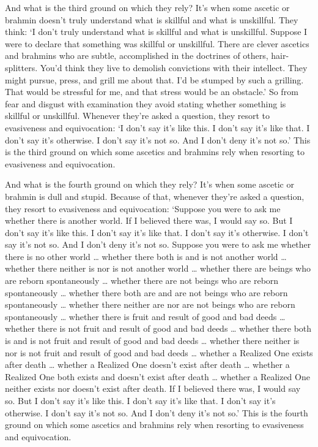 \documentclass[12pt,openany]{book}%
\begin{document}
And what is the third ground on which they rely? It’s when some ascetic or brahmin doesn’t truly understand what is skillful and what is unskillful. They think: ‘I don’t truly understand what is skillful and what is unskillful. Suppose I were to declare that something was skillful or unskillful. There are clever ascetics and brahmins who are subtle, accomplished in the doctrines of others, hair-splitters. You’d think they live to demolish convictions with their intellect. They might pursue, press, and grill me about that. I’d be stumped by such a grilling. That would be stressful for me, and that stress would be an obstacle.’ So from fear and disgust with examination they avoid stating whether something is skillful or unskillful. Whenever they’re asked a question, they resort to evasiveness and equivocation: ‘I don’t say it’s like this. I don’t say it’s like that. I don’t say it’s otherwise. I don’t say it’s not so. And I don’t deny it’s not so.’ This is the third ground on which some ascetics and brahmins rely when resorting to evasiveness and equivocation. 

And what is the fourth ground on which they rely? It’s when some ascetic or brahmin is dull and stupid. Because of that, whenever they’re asked a question, they resort to evasiveness and equivocation: ‘Suppose you were to ask me whether there is another world. If I believed there was, I would say so. But I don’t say it’s like this. I don’t say it’s like that. I don’t say it’s otherwise. I don’t say it’s not so. And I don’t deny it’s not so. Suppose you were to ask me whether there is no other world … whether there both is and is not another world … whether there neither is nor is not another world … whether there are beings who are reborn spontaneously … whether there are not beings who are reborn spontaneously … whether there both are and are not beings who are reborn spontaneously … whether there neither are nor are not beings who are reborn spontaneously … whether there is fruit and result of good and bad deeds … whether there is not fruit and result of good and bad deeds … whether there both is and is not fruit and result of good and bad deeds … whether there neither is nor is not fruit and result of good and bad deeds … whether a Realized One exists after death … whether a Realized One doesn’t exist after death … whether a Realized One both exists and doesn’t exist after death … whether a Realized One neither exists nor doesn’t exist after death. If I believed there was, I would say so. But I don’t say it’s like this. I don’t say it’s like that. I don’t say it’s otherwise. I don’t say it’s not so. And I don’t deny it’s not so.’ This is the fourth ground on which some ascetics and brahmins rely when resorting to evasiveness and equivocation. 
\end{document}

